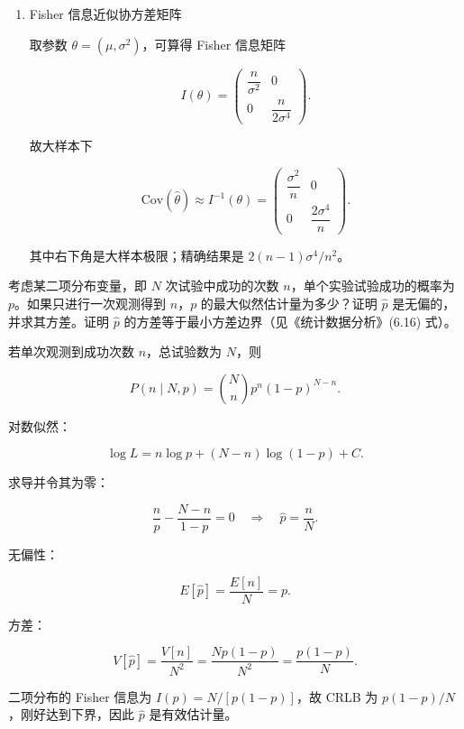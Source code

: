 \begin{question}
\begin{solution}
\begin{enumerate}
而第五章已知 \(E[s^2]=\sigma^2\)，高斯情形下

\[
V[s^2]=\frac{2\sigma^4}{n-1},
\]

所以

\[
E[\hat\sigma^2]=\frac{n-1}{n}\sigma^2,
\qquad
V[\hat\sigma^2]=\left(\frac{n-1}{n}\right)^2\frac{2\sigma^4}{n-1}
=\frac{2(n-1)}{n^2}\sigma^4.
\]

\item Fisher 信息近似协方差矩阵

取参数 \(\theta=(\mu,\sigma^2)\)，可算得 Fisher 信息矩阵

\[
I(\theta)=
\begin{pmatrix}
\dfrac{n}{\sigma^2} & 0\\[4pt]
0 & \dfrac{n}{2\sigma^4}
\end{pmatrix}.
\]

故大样本下

\[
\mathrm{Cov}(\hat\theta)\approx I^{-1}(\theta)=
\begin{pmatrix}
\dfrac{\sigma^2}{n} & 0\\[4pt]
0 & \dfrac{2\sigma^4}{n}
\end{pmatrix}.
\]

其中右下角是大样本极限；精确结果是 \(2(n-1)\sigma^4/n^2\)。
\end{enumerate}
\end{solution}
\end{question}


\begin{question}
考虑某二项分布变量，即 \(N\) 次试验中成功的次数
\(n\)，单个实验试验成功的概率为 \(p\)。如果只进行一次观测得到
\(n\)，\(p\) 的最大似然估计量为多少？证明 \(\hat p\)
是无偏的，并求其方差。证明 \(\hat p\)
的方差等于最小方差边界（见《统计数据分析》(6.16) 式）。
\begin{solution}
若单次观测到成功次数 \(n\)，总试验数为 \(N\)，则

\[
P(n\mid N,p)=\binom Nn p^n(1-p)^{N-n}.
\]

对数似然：

\[
\log L=n\log p+(N-n)\log(1-p)+C.
\]

求导并令其为零：

\[
\frac{n}{p}-\frac{N-n}{1-p}=0
\quad\Rightarrow\quad
\hat p=\frac nN.
\]

无偏性：

\[
E[\hat p]=\frac{E[n]}{N}=p.
\]

方差：

\[
V[\hat p]=\frac{V[n]}{N^2}=\frac{Np(1-p)}{N^2}=\frac{p(1-p)}{N}.
\]

二项分布的 Fisher 信息为 \(I(p)=N/[p(1-p)]\)，故 CRLB 为
\(p(1-p)/N\)，刚好达到下界，因此 \(\hat p\) 是有效估计量。
\end{solution}
\end{question}


